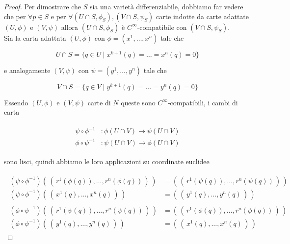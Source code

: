 \begin{proof}
	Per dimostrare che $ S $ sia una varietà differenziabile, dobbiamo far vedere che per $ \forall p \in S $ e per $ \forall (U \cap S,\phi_{S}),(V \cap S,\psi_{S}) $ carte indotte da carte adattate $ (U,\phi) $ e $ (V,\psi) $ allora $ (U \cap S,\phi_{S}) $ è $ C^{\infty} $-compatibile con $ (V \cap S,\psi_{S}) $.\\
	Sia la carta adattata $ (U,\phi) $ con $ \phi = (x^{1},\dots,x^{n}) $ tale che
	
	\begin{equation}
		U \cap S = \{ q \in U \mid x^{k+1}(q) = \dots = x^{n}(q) = 0 \}
	\end{equation}

	e analogamente $ (V,\psi) $ con $ \psi = (y^{1},\dots,y^{n}) $ tale che
	
	\begin{equation}
		V \cap S = \{ q \in V \mid y^{k+1}(q) = \dots = y^{n}(q) = 0 \}
	\end{equation}

	Essendo $ (U,\phi) $ e $ (V,\psi) $ carte di $ N $ queste sono $ C^{\infty} $-compatibili, i cambi di carta
	
	\begin{align}
		\begin{split}
			\psi \circ \phi^{-1} &: \phi(U \cap V) \to \psi(U \cap V)\\
			\phi \circ \psi^{-1} &: \psi(U \cap V) \to \phi(U \cap V)
		\end{split}
	\end{align}

	sono lisci, quindi abbiamo le loro applicazioni su coordinate euclidee
	
	\begin{align}
		\begin{split}
			(\psi \circ \phi^{-1}) (\, (\, r^{1}(\phi(q)),\dots,r^{n}(\phi(q)) \,) \,) &= (\, (\, r^{1}(\psi(q)),\dots,r^{n}(\psi(q)) \,) \,)\\
			(\psi \circ \phi^{-1}) (\, (\, x^{1}(q),\dots,x^{n}(q) \,) \,) &= (\, (\, y^{1}(q),\dots,y^{n}(q) \,) \,)\\\\
			(\phi \circ \psi^{-1}) (\, (\, r^{1}(\psi(q)),\dots,r^{n}(\psi(q)) \,) \,) &= (\, (\, r^{1}(\phi(q)),\dots,r^{n}(\phi(q)) \,) \,)\\
			(\phi \circ \psi^{-1}) (\, (\, y^{1}(q),\dots,y^{n}(q) \,) \,) &= (\, (\, x^{1}(q),\dots,x^{n}(q) \,) \,)
		\end{split}
	\end{align}


\end{proof}
